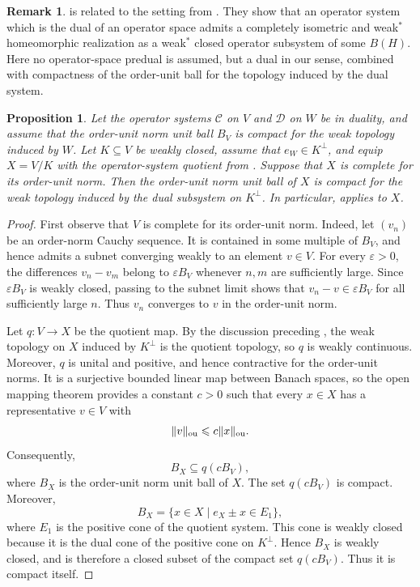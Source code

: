\documentclass[11pt,onecolumn]{article}
\theoremstyle{plain}
\newtheorem{proposition}[proposition]{Proposition}
\theoremstyle{definition}
\newtheorem{remark}[remark]{Remark}
\begin{document}
\begin{remark}
     is related to the setting from \cite{BlecherMagajna2011}.  They show that an
    operator system which is the dual of an operator space admits a completely
    isometric and weak$^*$ homeomorphic realization as a weak$^*$ closed
    operator subsystem of some $B(H)$.  Here no operator-space predual is
    assumed, but a dual in our sense, combined with compactness of the order-unit ball for the topology induced by the  dual system.
\end{remark}

\begin{proposition}
\label{prop:quotientcompact}
    Let the operator systems $\mathcal C$ on $V$ and $\mathcal D$ on $W$ be
    in duality, and assume that the order-unit norm unit ball $B_V$ is compact
    for the weak topology induced by $W$.  Let $K\subseteq V$ be weakly
    closed, assume that $e_W\in K^\perp$, and equip $X=V/K$ with the
    operator-system quotient from .  Suppose that $X$ is
    complete for its order-unit norm.
    Then the order-unit norm unit ball of $X$ is compact for the weak topology
    induced by the dual subsystem on $K^\perp$.  In particular,
     applies to $X$.
\end{proposition}

\begin{proof}
    First observe that $V$ is complete for its order-unit norm.  Indeed, let
    $(v_n)$ be an order-norm Cauchy sequence.  It is contained in some multiple
    of $B_V$, and hence admits a subnet converging weakly to an element
    $v\in V$.  For every $\varepsilon>0$, the differences $v_n-v_m$ belong to
    $\varepsilon B_V$ whenever $n,m$ are sufficiently large.  Since
    $\varepsilon B_V$ is weakly closed, passing to the subnet limit shows that
    $v_n-v\in\varepsilon B_V$ for all sufficiently large $n$.  Thus $v_n$
    converges to $v$ in the order-unit norm.

    Let $q\colon V\to X$ be the quotient map.  By the discussion preceding
    , the weak topology on $X$ induced by $K^\perp$ is the
    quotient topology, so $q$ is weakly continuous.  Moreover, $q$ is unital
    and positive, and hence contractive for the order-unit norms.  It is a
    surjective bounded linear map between Banach spaces, so the open mapping
    theorem provides a constant $c>0$ such that every $x\in X$ has a
    representative $v\in V$ with
    \[
        \lVert v\rVert_{\rm ou}\leqslant
        c\lVert x\rVert_{\rm ou}.
    \]
    Consequently,
    \[
        B_X\subseteq q(cB_V),
    \]
    where $B_X$ is the order-unit norm unit ball of $X$.  The set $q(cB_V)$
    is compact.  Moreover,
    \[
        B_X=\{x\in X\mid e_X\pm x\in E_1\},
    \]
    where $E_1$ is the positive cone of the quotient system.  This cone is
    weakly closed because it is the dual cone of the positive cone on
    $K^\perp$.  Hence $B_X$ is weakly closed, and is therefore a closed subset
    of the compact set $q(cB_V)$. Thus it is compact itself.
\end{proof}
\end{document}
